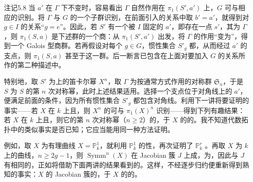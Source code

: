 \begin{SGAresult}{注记}{5.8}
当 $a'$ 在 $\Gamma$ 下不变时，容易看出 $\Gamma$ 自然作用在 $\pi_1(S',a')$ 上，$G$ 可与相应的识别。将 $\Gamma$ 与 $G$ 的一个子群识别，在前面引入的关系中取 $b'=a'$，就得到对 $g\in I$ 的关系“$g=e$”。因此，若 $S'$ 有一个被 $I$ 固定的 $a'$，即存在一点 $s'$，其为 $\Gamma$，则 $\pi_1(S,a)$ 是下述群的一个商：从 $\pi_1(S',a')$ 出发，将 $\Gamma$ 的作用“变为”，得到一个 Galois 型商群。若再假设对每个 $g\in G$，惯性集合 $S'_g$ 都，从而经过 $a'$ 的支点，则 $\pi_1(S,a)$ 甚至于这一群。后一断言已包含在上面对要加入 $G$ 的关系所作的第二种描述中。

特别地，取 $S'$ 为上的笛卡尔幂 $X^n$，取 $\Gamma$ 为按通常方式作用的对称群 $\mathfrak S_n$，于是 $S$ 为 $S$ 的第 $n$ 次对称幂，此时上述结果适用。选择一个支点位于对角线上的 $a'$，便满足前面的条件，因为所有惯性集合 $S'_g$ 都包含对角线。利用下一讲将要证明的事实——若 $X$ 在 $k$ 上且，则 $X^n$ 的可与 $\pi_1(X)^n$ 识别——得到下列有趣结果：若 $X$ 在 $k$ 上且，则它的第 $n$ 次对称幂（$n\geq2$）的，于 $X$ 的的。我不知道代数拓扑中的类似事实是否已知；它应当能用同一种方法证明。

例如，取 $X$ 为有理曲线 $X=\mathbb P^1_k$，就利用 $\mathbb P^1_k$ 的性，再次证明了 $\mathbb P^r_k$ 。再取 $X$ 为 $k$ 上的曲线，$n\geq2g-1$，则 $\operatorname{Symm}^n(X)$ 在 Jacobian 簇 $J$ 上成，为，因此与 $J$ 有相同的，正如将借助下面两讲的结果看到的。这样，不经逐步归约便重新得到熟知的事实：$X$ 的 Jacobian 簇的，于 $X$ 的的。
\end{SGAresult}

